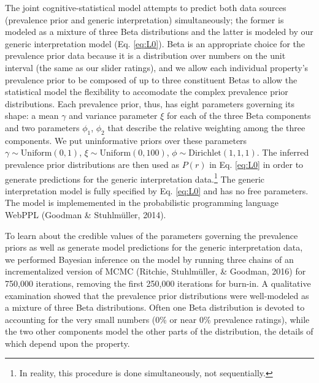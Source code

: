 \documentclass[floatsintext,doc]{apa6}
\theoremstyle{definition}
\theoremstyle{definition}
\theoremstyle{definition}
\theoremstyle{remark}
\begin{document}
The joint cognitive-statistical model attempts to predict both data
sources (prevalence prior and generic interpretation) simultaneously;
the former is modeled as a mixture of three Beta distributions and the
latter is modeled by our generic interpretation model (Eq. \ref{eq:L0}).
Beta is an appropriate choice for the prevalence prior data because it
is a distribution over numbers on the unit interval (the same as our
slider ratings), and we allow each individual property's prevalence
prior to be composed of up to three constituent Betas to allow the
statistical model the flexibility to accomodate the complex prevalence
prior distributions. Each prevalence prior, thus, has eight parameters
governing its shape: a mean \(\gamma\) and variance parameter \(\xi\)
for each of the three Beta components and two parameters \(\phi_1\),
\(\phi_2\) that describe the relative weighting among the three
components. We put uninformative priors over these parameters
\(\gamma \sim \text{Uniform}(0, 1)\),
\(\xi \sim \text{Uniform}(0, 100)\),
\(\phi \sim \text{Dirichlet}(1,1,1)\). The inferred prevalence prior
distributions are then used as \(P(r)\) in Eq. \ref{eq:L0} in order to
generate predictions for the generic interpretation data.\footnote{In
  reality, this procedure is done simultaneously, not sequentially.} The
generic interpretation model is fully specified by Eq. \ref{eq:L0} and
has no free parameters. The model is implememented in the probabilistic
programming language WebPPL (Goodman \& Stuhlmüller, 2014).


To learn about the credible values of the parameters governing the
prevalence priors as well as generate model predictions for the generic
interpretation data, we performed Bayesian inference on the model by
running three chains of an incrementalized version of MCMC (Ritchie,
Stuhlmüller, \& Goodman, 2016) for 750,000 iterations, removing the
first 250,000 iterations for burn-in. A qualitative examination showed
that the prevalence prior distributions were well-modeled as a mixture
of three Beta distributions. Often one Beta distribution is devoted to
accounting for the very small numbers (0\% or near 0\% prevalence
ratings), while the two other components model the other parts of the
distribution, the details of which depend upon the property.
\end{document}
